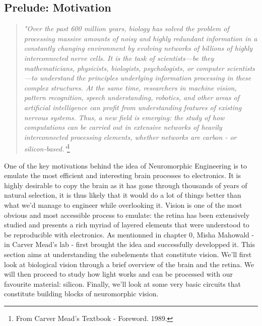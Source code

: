 \subsection{Prelude: Motivation}

\begin{quote}
    \textit{"Over the past 600 million years, biology has solved the problem of processing massive amounts of noisy and highly redundant information in a constantly changing environment by evolving networks of billions of highly interconnected nerve cells. It is the task of scientists—be they mathematicians, physicists, biologists, psychologists, or computer scientists—to understand the principles underlying information processing in these complex structures. At the same time, researchers in machine vision, pattern recognition, speech understanding, robotics, and other areas of artificial intelligence can profit from understanding features of existing nervous systems. Thus, a new field is emerging: the study of how computations can be carried out in extensive networks of heavily interconnected processing elements, whether networks are carbon - or silicon-based."}\footnote{From Carver Mead's Textbook - Foreword. 1989.}
\end{quote}

One of the key motivations behind the idea of Neuromorphic Engineering is to emulate the most efficient and interesting brain processes to electronics. It is highly desirable to copy the brain as it has gone through thousands of years of natural selection, it is thus likely that it would do a lot of things better than what we'd manage to engineer while overlooking it. Vision is one of the most obvious and most accessible process to emulate: the retina has been extensively studied and presents a rich myriad of layered elements that were understood to be reproducible with electronics. As mentionned in chapter 0, Misha Mahowald - in Carver Mead's lab - first brought the idea and successfully developped it. This section aims at understanding the subelements that constitute vision. We'll first look at biological vision through a brief overview of the brain and the retina. We will then proceed to study how light works and can be processed with our favourite material: silicon. Finally, we'll look at some very basic circuits that constitute building blocks of neuromorphic vision.   

